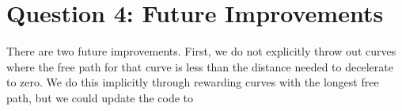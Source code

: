 \section{Question 4: Future Improvements} 

There are two future improvements. First, we do not explicitly throw out curves where the free path for that curve is less than the distance needed to decelerate to zero. We do this implicitly through rewarding curves with the longest free path, but we could update the code to 